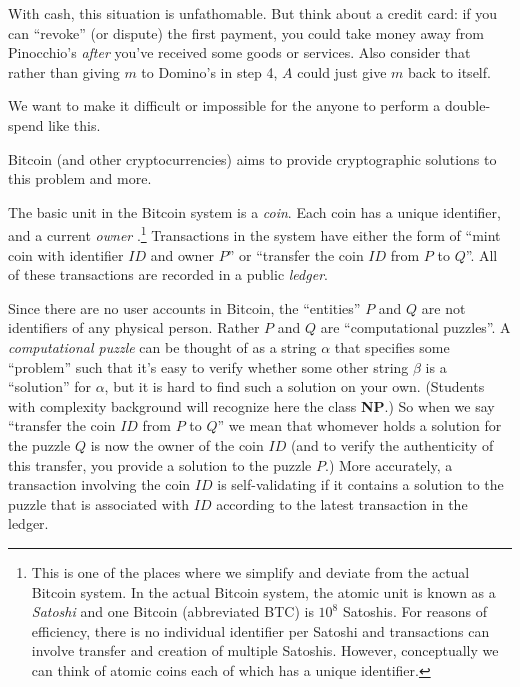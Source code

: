 With cash, this situation is unfathomable. But think about a credit
card: if you can ``revoke'' (or dispute) the first payment, you could
take money away from Pinocchio's \emph{after} you've received some goods
or services. Also consider that rather than giving \(m\) to Domino's in
step 4, \(A\) could just give \(m\) back to itself.

We want to make it difficult or impossible for the anyone to perform a
double-spend like this.

Bitcoin (and other cryptocurrencies) aims to provide cryptographic
solutions to this problem and more.

The basic unit in the Bitcoin system is a \emph{coin}. Each coin has a
unique identifier, and a current \emph{owner} .\footnote{This is one of
  the places where we simplify and deviate from the actual Bitcoin
  system. In the actual Bitcoin system, the atomic unit is known as a
  \emph{Satoshi} and one Bitcoin (abbreviated BTC) is \(10^8\) Satoshis.
  For reasons of efficiency, there is no individual identifier per
  Satoshi and transactions can involve transfer and creation of multiple
  Satoshis. However, conceptually we can think of atomic coins each of
  which has a unique identifier.} Transactions in the system have either
the form of ``mint coin with identifier \(\ensuremath{\mathit{ID}}\) and
owner \(P\)'' or ``transfer the coin \(\ensuremath{\mathit{ID}}\) from
\(P\) to \(Q\)''. All of these transactions are recorded in a public
\emph{ledger}.

Since there are no user accounts in Bitcoin, the ``entities'' \(P\) and
\(Q\) are not identifiers of any physical person. Rather \(P\) and \(Q\)
are ``computational puzzles''. A \emph{computational puzzle} can be
thought of as a string \(\alpha\) that specifies some ``problem'' such
that it's easy to verify whether some other string \(\beta\) is a
``solution'' for \(\alpha\), but it is hard to find such a solution on
your own. (Students with complexity background will recognize here the
class \textbf{NP}.) So when we say ``transfer the coin
\(\ensuremath{\mathit{ID}}\) from \(P\) to \(Q\)'' we mean that whomever
holds a solution for the puzzle \(Q\) is now the owner of the coin
\(\ensuremath{\mathit{ID}}\) (and to verify the authenticity of this
transfer, you provide a solution to the puzzle \(P\).) More accurately,
a transaction involving the coin \(\ensuremath{\mathit{ID}}\) is
self-validating if it contains a solution to the puzzle that is
associated with \(\ensuremath{\mathit{ID}}\) according to the latest
transaction in the ledger.

